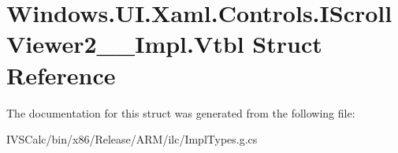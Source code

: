 \hypertarget{struct_windows_1_1_u_i_1_1_xaml_1_1_controls_1_1_i_scroll_viewer2_____impl_1_1_vtbl}{}\section{Windows.\+U\+I.\+Xaml.\+Controls.\+I\+Scroll\+Viewer2\+\_\+\+\_\+\+Impl.\+Vtbl Struct Reference}
\label{struct_windows_1_1_u_i_1_1_xaml_1_1_controls_1_1_i_scroll_viewer2_____impl_1_1_vtbl}


The documentation for this struct was generated from the following file\+:\begin{DoxyCompactItemize}
\item 
I\+V\+S\+Calc/bin/x86/\+Release/\+A\+R\+M/ilc/Impl\+Types.\+g.\+cs\end{DoxyCompactItemize}
